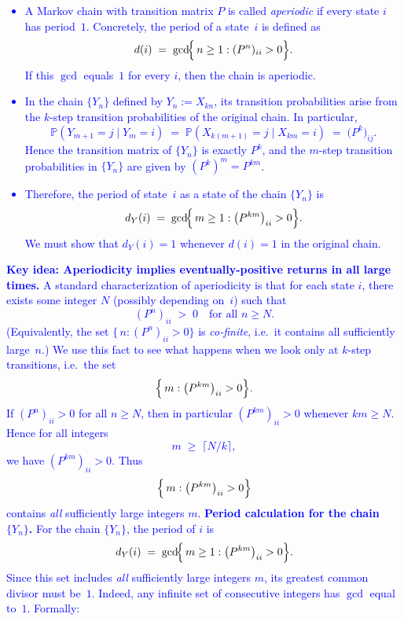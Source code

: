 \documentclass{article}
\begin{document}
\begin{enumerate}
            \textcolor{blue}{\begin{itemize}
\item A Markov chain with transition matrix $P$ is called \emph{aperiodic} if every state $i$ has period~$1$.  Concretely, the period of a state~$i$ is defined as
\[
   d(i) \;=\; \gcd\!\Bigl\{\, n \ge 1 : (P^n)_{ii} > 0 \Bigr\}.
\]
If this $\gcd$ equals~$1$ for every $i$, then the chain is aperiodic.  
\item In the chain $\{Y_n\}$ defined by $Y_n := X_{kn}$, its transition probabilities arise from the $k$-step transition probabilities of the original chain.  In particular,
\[
  \mathbb{P}(Y_{m+1} = j \mid Y_m = i)
  \;=\; \mathbb{P}(X_{k(m+1)} = j \mid X_{km} = i)
  \;=\; \bigl(P^k\bigr)_{ij}.
\]
Hence the transition matrix of $\{Y_n\}$ is exactly $P^k$, and the $m$-step transition probabilities in $\{Y_n\}$ are given by $(P^k)^m = P^{km}$.
\item Therefore, the period of state~$i$ as a state of the chain $\{Y_n\}$ is
\[
   d_Y(i) \;=\; \gcd\!\Bigl\{\, m \ge 1 : \bigl(P^{km}\bigr)_{ii} > 0 \Bigr\}.
\]
We must show that $d_Y(i) = 1$ whenever $d(i) = 1$ in the original chain.
\end{itemize}
\bigskip
\noindent
\textbf{Key idea: Aperiodicity implies eventually-positive returns in all large times.}
A standard characterization of aperiodicity is that for each state $i$, there exists some integer $N$ (possibly depending on~$i$) such that 
\[
  (P^n)_{ii} \;>\; 0 \quad \text{for all } n \ge N.
\]
(Equivalently, the set $\{\,n : (P^n)_{ii} > 0\}$ is \emph{co‐finite}, i.e.\ it contains all sufficiently large~$n$.)
We use this fact to see what happens when we look only at $k$-step transitions, i.e.\ the set 
\[
   \Bigl\{\, m : \bigl(P^{km}\bigr)_{ii} > 0 \Bigr\}.
\]
If $(P^n)_{ii} > 0$ for all $n\ge N$, then in particular $(P^{km})_{ii} > 0$ whenever $km \ge N$.  Hence for all integers
\[
   m \;\ge\; \bigl\lceil N/k \bigr\rceil,
\]
we have $(P^{km})_{ii} > 0.$  Thus 
\[
   \Bigl\{\, m : \bigl(P^{km}\bigr)_{ii} > 0 \Bigr\}
\]
contains \emph{all} sufficiently large integers $m$.
\bigskip
\noindent
\textbf{Period calculation for the chain $\{Y_n\}$.}
For the chain $\{Y_n\}$, the period of $i$ is 
\[
  d_Y(i) 
  \;=\; \gcd\!\Bigl\{\, m \ge 1 : \bigl(P^{km}\bigr)_{ii} > 0 \Bigr\}.
\]
Since this set includes \emph{all} sufficiently large integers $m$, its greatest common divisor must be~$1$.  Indeed, any infinite set of consecutive integers has $\gcd$ equal to~$1$.  Formally:
\begin{itemize}

\end{itemize}}
\end{enumerate}
\end{document}
